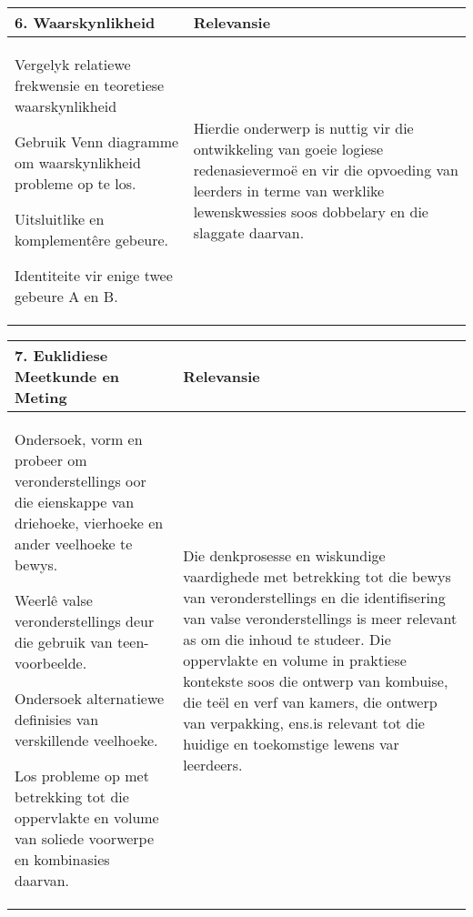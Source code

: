\begin{table}[H]
 \begin{center} 
\begin{tabular}{|p{8.5cm}|p{3.5cm}|} \hline
\textbf{6. Waarskynlikheid}& \textbf{Relevansie} \\ \hline  
Vergelyk relatiewe frekwensie en teoretiese waarskynlikheid\par
Gebruik Venn diagramme om waarskynlikheid probleme op te los.\par
Uitsluitlike en komplement\^{e}re gebeure.\par
Identiteite vir enige twee gebeure A en B.
&
Hierdie onderwerp is nuttig vir die ontwikkeling van goeie logiese
redenasievermo\"{e} en vir die opvoeding van leerders in terme van
werklike lewenskwessies soos dobbelary en die slaggate daarvan.
\\ \hline

 \end{tabular}
\end{center}
\end{table}


\begin{table}[H]
 \begin{center} 
\begin{tabular}{|p{8.5cm}|p{3.5cm}|} \hline
\textbf{7. Euklidiese Meetkunde en Meting}& \textbf{Relevansie}\\ \hline  
Ondersoek, vorm en probeer om veronderstellings oor die eienskappe van driehoeke, vierhoeke en ander veelhoeke te bewys.\par
Weerl\^{e} valse veronderstellings deur die gebruik van teen-voorbeelde.\par
Ondersoek alternatiewe definisies van verskillende veelhoeke.\par
Los probleme op met betrekking tot die oppervlakte en volume van soliede voorwerpe en kombinasies daarvan.
&
Die denkprosesse en wiskundige vaardighede met betrekking tot die
bewys van veronderstellings en ​​die identifisering van valse
veronderstellings is meer relevant as om die inhoud te studeer.
Die oppervlakte en volume in praktiese kontekste soos die ontwerp van
kombuise, die te\"{e}l en verf van kamers, die ontwerp van verpakking,
ens.\@ is relevant tot die huidige en toekomstige lewens var leerdeers.
\\ \hline

 \end{tabular}
\end{center}
\end{table}

